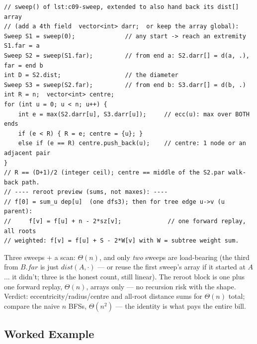 \begin{lstlisting}[caption={The full metric readout: two sweeps -> ecc table -> radius, centre, and the distance-sum reroot}, label={lst:c09-eccsweep}]
// sweep() of lst:c09-sweep, extended to also hand back its dist[] array
// (add a 4th field  vector<int> darr;  or keep the array global):
Sweep S1 = sweep(0);              // any start -> reach an extremity S1.far = a
Sweep S2 = sweep(S1.far);         // from end a: S2.darr[] = d(a, .), far = end b
int D = S2.dist;                  // the diameter
Sweep S3 = sweep(S2.far);         // from end b: S3.darr[] = d(b, .)
int R = n;  vector<int> centre;
for (int u = 0; u < n; u++) {
    int e = max(S2.darr[u], S3.darr[u]);     // ecc(u): max over BOTH ends
    if (e < R) { R = e; centre = {u}; }
    else if (e == R) centre.push_back(u);    // centre: 1 node or an adjacent pair
}
// R == (D+1)/2 (integer ceil); centre == middle of the S2.par walk-back path.
// ---- reroot preview (sums, not maxes): ----
// f[0] = sum_u dep[u]  (one dfs3); then for tree edge u->v (u parent):
//     f[v] = f[u] + n - 2*sz[v];             // one forward replay, all roots
// weighted: f[v] = f[u] + S - 2*W[v] with W = subtree weight sum.
\end{lstlisting}

\begin{complexitybox}
Three sweeps + a scan: $\Theta(n)$, and only \emph{two} sweeps are load-bearing (the
third from $B.\mathit{far}$ is just $\mathit{dist}(A,\cdot)$ --- or reuse the first
sweep's array if it started at $A$... it didn't; three is the honest count, still
linear). The reroot block is one  plus one forward replay,
$\Theta(n)$, arrays only --- no recursion risk with the  shape.
Verdict: eccentricity/radius/centre and all-root distance sums for $\Theta(n)$ total;
compare the naive $n$ BFSs, $\Theta(n^2)$ --- the identity  is what
pays the entire bill.
\end{complexitybox}

\subsection{Worked Example}

